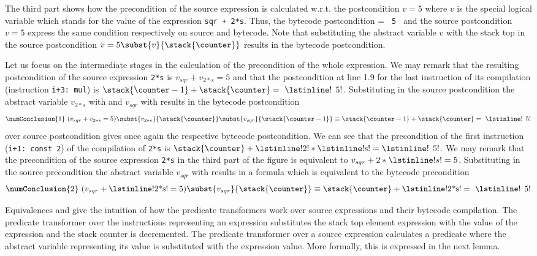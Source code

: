 The third part shows how the precondition of the source expression is calculated w.r.t. the postcondition $v = 5$ where 
$v$ is the special logical variable which stands for the value of the expression \lstinline!sqr + 2*s!.
Thus, the bytecode postcondition \stack{\counter} = \lstinline! 5 ! and the source postcondition $v = 5$ express the same condition
respectively on source and bytecode.
Note that  substituting the abstract variable $v$ with the stack top in the source postcondition $ v = 5\subst{v}{\stack{\counter}}$ 
results in the bytecode postcondition.

 Let us focus on the intermediate stages in the calculation of the precondition of the whole expression.
We may  remark that the resulting 
postcondition   of the source expression   \lstinline!2*s! is $v_{sqr} +v_{2*s}=5$ and that the postcondition at line 1.9
for the last instruction of its compilation (instruction \lstinline!i+3: mul!) is $\stack{\counter - 1}  + \stack{\counter} =~\mbox{\rm \lstinline! 5!}  $.
Substituting in the source postcondition the abstract variable $v_{2*s}$ with \stack{\counter} and $v_{sqr}$  with  results
in the bytecode postcondition
 $$ \numConclusion{1} \ (v_{sqr} +v_{2*s}=5)  \subst{v_{2*s}}{\stack{\counter}}\subst{v_{sqr}}{\stack{\counter-1}} \equiv\stack{\counter - 1}  + \stack{\counter} =~\mbox{\rm \lstinline! 5!} $$
  over source postcondition 
gives once again the respective bytecode postcondition. We can see that the precondition of  the first instruction (\lstinline!i+1: const 2!)
of the compilation of 
\lstinline!2*s! is   $\stack{\counter} + \mbox{\rm \lstinline!2!}*\mbox{\rm \lstinline!s!} = \mbox{\rm \lstinline! 5!}$. We may remark that the 
precondition of the source expression \lstinline!2*s!  in the third part of the figure is equivalent to $v_{sqr} + 2*\lstinline!s!=5 $.
Substituting in the source precondition the abstract variable $v_{sqr}$ with \stack{\counter} results
in a formula which is equivalent to the bytecode precondition
 $$\numConclusion{2} \ (v_{sqr} +\mbox{\rm \lstinline!2*s!} =5) \subst{v_{sqr}}{\stack{\counter}} \equiv \stack{\counter }  + \mbox{\rm \lstinline!2*s!}  = ~\mbox{\rm \lstinline! 5!} $$

Equivalences   and  give the intuition of how the predicate transformers work over  source expressions and 
their bytecode compilation. The predicate transformer over the instructions representing an expression
 substitutes the stack top element expression  \stack{\counter} with the value of the expression and the stack counter is decremented. The predicate transformer 
over a source expression calculates a predicate where the abstract variable representing its value is substituted with the expression value. 
More formally, this is expressed in the next lemma.  

